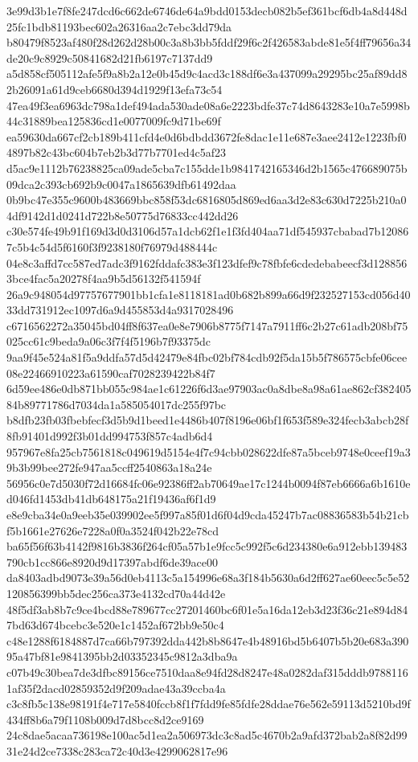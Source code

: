 \documentclass[11pt,a4paper]{article}
\begin{document}
{3e99d3b1e7f8fe247dcd6c662de6746de64a9bdd0153decb082b5ef361bcf6db4a8d448d25fc1bdb81193bec602a26316aa2c7ebc3dd79da
b80479f8523af480f28d262d28b00c3a8b3bb5fddf29f6c2f426583abde81e5f4ff79656a34de20c9c8929c50841682d21fb6197c7137dd9
a5d858cf505112afe5f9a8b2a12e0b45d9c4acd3c188df6e3a437099a29295bc25af89dd82b26091a61d9ceb6680d394d1929f13efa73c54
47ea49f3ea6963dc798a1def494ada530ade08a6e2223bdfe37c74d8643283e10a7e5998b44c31889bea125836cd1e0077009fc9d71be69f
ea59630da667cf2cb189b411cfd4e0d6bdbdd3672fe8dac1e11e687e3aee2412e1223fbf04897b82c43bc604b7eb2b3d77b7701ed4c5af23
d5ac9e1112b76238825ca09ade5cba7c155dde1b9841742165346d2b1565c476689075b09dca2c393cb692b9c0047a1865639dfb61492daa
0b9bc47e355c9600b483669bbc858f53dc6816805d869ed6aa3d2e83c630d7225b210a04df9142d1d0241d722b8e50775d76833cc442dd26
c30e574fe49b91f169d3d0d3106d57a1dcb62f1e1f3fd404aa71df545937cbabad7b120867c5b4c54d5f6160f3f9238180f76979d488444c
04e8c3affd7cc587ed7adc3f9162fddafc383e3f123dfef9c78fbfe6cdedebabeecf3d1288563bce4fac5a20278f4aa9b5d56132f541594f
26a9c948054d97757677901bb1cfa1e8118181ad0b682b899a66d9f232527153cd056d4033dd731912ec1097d6a9d455853d4a9317028496
c6716562272a35045bd04ff8f637ea0e8e7906b8775f7147a7911ff6c2b27c61adb208bf75025cc61c9beda9a06c3f7f4f5196b7f93375dc
9aa9f45e524a81f5a9ddfa57d5d42479e84fbc02bf784cdb92f5da15b5f786575cbfe06cee08e22466910223a61590caf7028239422b84f7
6d59ee486e0db871bb055c984ae1c61226f6d3ae97903ac0a8dbe8a98a61ae862cf38240584b89771786d7034da1a585054017dc255f97bc
b8dfb23fb03fbebfecf3d5b9d1beed1e4486b407f8196e06bf1f653f589e324fecb3abcb28f8fb91401d992f3b01dd994753f857c4adb6d4
957967e8fa25cb7561818c049619d5154e4f7c94cbb028622dfe87a5bceb9748e0ceef19a39b3b99bee272fe947aa5ccff2540863a18a24e
56956c0e7d5030f72d16684fc06e92386ff2ab70649ae17c1244b0094f87eb6666a6b1610ed046fd1453db41db648175a21f19436af6f1d9
e8e9cba34e0a9eeb35e039902ee5f997a85f01d6f04d9cda45247b7ac08836583b54b21cbf5b1661e27626e7228a0f0a3524f042b22e78cd
ba65f56f63b4142f9816b3836f264cf05a57b1e9fcc5c992f5c6d234380e6a912ebb139483790cb1cc866e8920d9d17397abdf6de39ace00
da8403adbd9073e39a56d0eb4113c5a154996e68a3f184b5630a6d2ff627ae60eec5c5e52120856399bb5dec256ca373e4132cd70a44d42e
48f5df3ab8b7c9ce4bcd88e789677cc27201460bc6f01e5a16da12eb3d23f36c21e894d847bd63d674bcebc3e520e1c1452af672bb9e50c4
c48e1288f6184887d7ca66b797392dda442b8b8647e4b48916bd5b6407b5b20e683a39095a47bf81e9841395bb2d03352345c9812a3dba9a
c07b49c30bea7de3dfbc89156ce7510daa8e94fd28d8247e48a0282daf315dddb97881161af35f2dacd02859352d9f209adae43a39ccba4a
c3c8fb5c138e98191f4e717e5840fccb8f1f7fdd9fe85fdfe28ddae76e562e59113d5210bd9f434ff8b6a79f1108b009d7d8bcc8d2ce9169
24c8dae5acaa736198e100ac5d1ea2a506973dc3c8ad5c4670b2a9afd372bab2a8f82d9931e24d2ce7338c283ca72c40d3e4299062817e96
}
\end{document}
